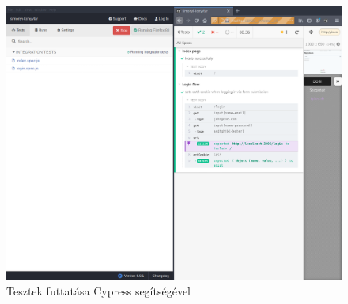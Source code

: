 \begin{figure}[!ht]
  \centering
  \includegraphics[width=150mm, keepaspectratio]{figures/cypress.png}
  \caption{Tesztek futtatása Cypress segítségével}
  \label{fig:Cypress}
\end{figure}
